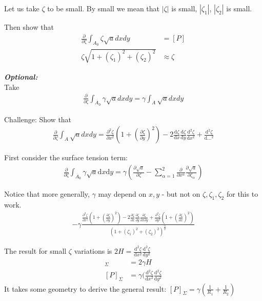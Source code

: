 \documentclass{article}
\renewcommand{\d}[0]{\mathrm{d}}
\newcommand{\dOne}[2]{\frac{\d #1}{\d #2}}
\newcommand{\pOne}[2]{\frac{\partial #1}{\partial #2}}
\newcommand{\dTwo}[3]{\frac{\d^2 #1}{\d #2^2}}
\newcommand{\pTwo}[3]{\frac{\partial^2 #1}{\partial #2^2}}
\newenvironment{aside}{\begin{mdframed}\textbf{\textit{Optional:}}\\}{\end{mdframed}}
\begin{document}
  \begin{section}{Let us take $\zeta$ to be small.}
    By small we mean that $|\zeta|$ is small, $|\zeta_1|$, $|\zeta_2|$ is small. 
    
    Then show that \begin{align*}
      \frac{\partial}{\partial \zeta} \int_{A_0} \zeta\sqrt{a}dx dy &= [P]\\
      \zeta\sqrt{1 + (\zeta_1)^2 + (\zeta_2)^2} &\approx \zeta
  \end{align*}
\begin{aside}
    Take 
		\begin{align*}
		\frac{\partial}{\partial\zeta}\int_{A_0} \gamma \sqrt{a} dx dy = \gamma \int_A \sqrt{a}dx dy
		\end{align*}

    Challenge: Show that 
		\begin{align*}
			\frac{\partial}{\partial\zeta} \int_A \sqrt{a} dx dy = \frac{\partial^2 \zeta}{\partial x^2} ( 1+ (\frac{\partial\zeta}{\partial y})^2) - 2\dOne{\zeta}{x}\dOne{\zeta}{y}\dTwo{\zeta}{x}{y}+ \dTwo{\zeta}{\dots}\dots
		\end{align*}
  \end{aside}

  First consider the surface tension term:
  \begin{align*}
    \pOne{}{\zeta}\int_{A_0}^{}\gamma\sqrt{a}\d x\d y = \gamma\left(\pOne{\sqrt{a}}{\zeta} - \sum_{\alpha=1}^{2} \pOne{}{x^\alpha} \pOne{\sqrt{a}}{\zeta_\alpha}\right)
  \end{align*}
  
	Notice that more generally, $\gamma$ may depend on $x,y$ - but not on $\zeta, \zeta_1,\zeta_2$ for this to work.
	\begin{align*}
		-\gamma \frac{ \pTwo{\zeta}{x}  \left(1 + ( \pOne{\zeta}{y} )^2) - 2 \pOne{\zeta}{x}\pOne{\zeta}{y}\frac{\partial\zeta}{\partial x\partial y} + \pTwo{\zeta}{y} \left( 1+ ( \pOne{\zeta}{x} )^2) }{\left(1 + (\zeta_1)^2 + (\zeta_2)^2\right)^\frac{3}{2}}
	\end{align*}
	
	
	
	
	
	
	The result for small $\zeta$ variations is $2H = \dTwo{\zeta}{x} + \dTwo{\zeta}{y} \therefore$
    \begin{align}
      [P]_\Sigma &= 2\gamma H\\
      [P]_\Sigma &= \gamma(\dTwo{\zeta}{x} + \dTwo{\zeta}{y})
      \label{Eq:Laplace}
    \end{align}
    It takes some geometry to derive the general result: $[P]_\Sigma = \gamma(\frac{1}{R_1} + \frac{1}{R_2})$


\end{section}
\end{document}

